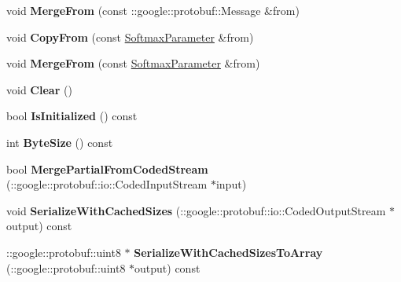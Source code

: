 \begin{DoxyCompactItemize}
void {\bfseries Merge\+From} (const \+::google\+::protobuf\+::\+Message \&from)
\item 
\mbox{\label{classcaffe_1_1_softmax_parameter_a1e000a7ac0032fb2145947af5279d055}} 
void {\bfseries Copy\+From} (const \mbox{\hyperlink{classcaffe_1_1_softmax_parameter}{Softmax\+Parameter}} \&from)
\item 
\mbox{\label{classcaffe_1_1_softmax_parameter_a7818feca3923c69fdc3d4a858bae83eb}} 
void {\bfseries Merge\+From} (const \mbox{\hyperlink{classcaffe_1_1_softmax_parameter}{Softmax\+Parameter}} \&from)
\item 
\mbox{\label{classcaffe_1_1_softmax_parameter_afc10c708f8b8ced4b8073e8d8a9727c0}} 
void {\bfseries Clear} ()
\item 
\mbox{\label{classcaffe_1_1_softmax_parameter_afc25b2687b3ce876c6eb09545673196d}} 
bool {\bfseries Is\+Initialized} () const
\item 
\mbox{\label{classcaffe_1_1_softmax_parameter_a9d3f1766c856b3401684955e170a72ff}} 
int {\bfseries Byte\+Size} () const
\item 
\mbox{\label{classcaffe_1_1_softmax_parameter_a4babb1d019f772b910f45fbb3549c7f6}} 
bool {\bfseries Merge\+Partial\+From\+Coded\+Stream} (\+::google\+::protobuf\+::io\+::\+Coded\+Input\+Stream $\ast$input)
\item 
\mbox{\label{classcaffe_1_1_softmax_parameter_a0cc7c4a29da69430daf0cb18ce6e5897}} 
void {\bfseries Serialize\+With\+Cached\+Sizes} (\+::google\+::protobuf\+::io\+::\+Coded\+Output\+Stream $\ast$output) const
\item 
\mbox{\label{classcaffe_1_1_softmax_parameter_af409f3e42ff4f855a9c2d16d7774fd57}} 
\+::google\+::protobuf\+::uint8 $\ast$ {\bfseries Serialize\+With\+Cached\+Sizes\+To\+Array} (\+::google\+::protobuf\+::uint8 $\ast$output) const
\item 
\mbox{\label{classcaffe_1_1_softmax_parameter_aa7ef703fcc8e6fdba1e7a2cb8e1900eb}} 

\end{DoxyCompactItemize}
